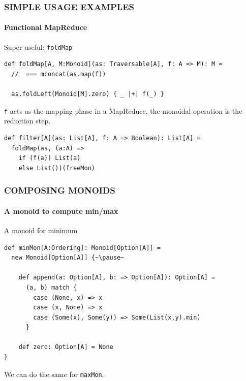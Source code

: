 \documentclass{beamer}
\begin{document}
\begin{frame}[fragile] \frametitle{SIMPLE USAGE EXAMPLES}
  \framesubtitle{Functional MapReduce}
  \begin{block}{Super useful: \texttt{foldMap}}
  \begin{lstlisting}
def foldMap[A, M:Monoid](as: Traversable[A], f: A => M): M =
  //  === mconcat(as.map(f))

  as.foldLeft(Monoid[M].zero) { _ |+| f(_) }
  \end{lstlisting}
  \end{block}

  \texttt{f} acts as the mapping phase in a MapReduce, the monoidal
  operation is the reduction step.

  \begin{block}{}
  \begin{lstlisting}
def filter[A](as: List[A], f: A => Boolean): List[A] =
  foldMap(as, (a:A) =>
    if (f(a)) List(a)
    else List())(freeMon)
  \end{lstlisting}
  \end{block}
\end{frame}


\begin{frame}[fragile] \frametitle{COMPOSING MONOIDS}
  \framesubtitle{A monoid to compute min/max}
  \begin{block}{A monoid for minimum}
  \begin{lstlisting}
def minMon[A:Ordering]: Monoid[Option[A]] =
  new Monoid[Option[A]] {~\pause~

    def append(a: Option[A], b: => Option[A]): Option[A] =
      (a, b) match {
        case (None, x) => x
        case (x, None) => x
        case (Some(x), Some(y)) => Some(List(x,y).min)
      }

    def zero: Option[A] = None
}
  \end{lstlisting}
  \end{block}
  We can do the same for \texttt{maxMon}.
\end{frame}
\end{document}
